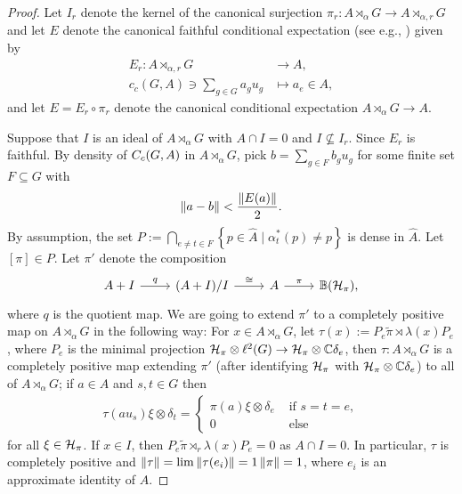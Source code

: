 \begin{proof}
	Let $I_r$ denote the kernel of the canonical surjection $ \pi_r \colon A \rtimes_\alpha G \to A \rtimes_{\alpha , r}G$ and let $E$ denote the canonical faithful conditional expectation (see e.g., \cite[Proposition 4.1.9]{brown2008c} ) given by
	\begin{align*}
	E_r \colon A \rtimes_{\alpha,r} G &\to A, \\ 
		c_c(G,A) \ni \sum_{g \in G} a_g  u_g &\mapsto a_e \in A,
	\end{align*}
	and let $E = E_r \circ \pi_r$ denote the canonical conditional expectation $A \rtimes_{\alpha }G \to A$.
	
	Suppose that $I$ is an ideal of $A \rtimes_\alpha G$ with $A \cap I=0$ and $I \not \subseteq I_r$. Since $E_r$ is faithful. By density of $C_c(G,A)$ in $A \rtimes_\alpha G$, pick $b = \sum_{g \in F} b_g u_g$ for some finite set $F \subseteq G$ with
	\begin{align*}
		\left\lVert a - b \right\rVert < \frac{\left\lVert E (a) \right\rVert}{2}.
	\end{align*}
	By assumption, the set $P := \bigcap_{e \neq t \in F}\left\{ p \in \hat A \mid \alpha_{t}^*(p) \neq p \right\}$ is dense in $\hat A$. Let $[\pi] \in P$. Let $\pi'$ denote the composition
	\begin{equation*}
		\begin{tikzcd}
			A + I \ar[r, "q"] & (A+I)/I \ar[r, "\cong"] & A \ar[r, "\pi"]  & \mathbb{B}(\H_\pi),
		\end{tikzcd}
	\end{equation*}
	where $q$ is the quotient map. We are going to extend $\pi'$ to a completely positive map on $A \rtimes_\alpha G$ in the following way:	For $x \in A \rtimes_\alpha G$, let $\tau(x) := P _e\tilde \pi \rtimes \lambda(x) P_e$, where $P_e$ is the minimal projection $\mathcal{H}_\pi \otimes \ell^2(G) \to \mathcal{H}_\pi \otimes \mathbb{C} \delta_{e}$, then $\tau \colon A \rtimes_\alpha G$ is a completely positive map extending $\pi'$ (after identifying $\mathcal{H}_\pi$ with $\mathcal{H}_\pi \otimes \mathbb{C} \delta_e$) to all of $A \rtimes_\alpha G$; if $a \in A$ and $s,t \in G$ then
	\begin{align*}
		\tau(au_s) \xi \otimes \delta_t = \begin{cases}
			\pi(a) \xi \otimes \delta_e & \text{ if } s = t = e,\\
			0 & \text{ else}
		\end{cases}
	\end{align*}
	for all $\xi \in \mathcal{H}_\pi$. If $x \in I$, then $P_e \tilde \pi \rtimes_r \lambda (x) P_e = 0$ as $A \cap I = 0$. In particular, $\tau$ is completely positive and $\left\lVert \tau \right\rVert = \lim \left\lVert \tau(e_i)\right\rVert = 1\left\lVert \pi \right\rVert = 1$, where $e_i$ is an approximate identity of $A$. 
	

\end{proof}
